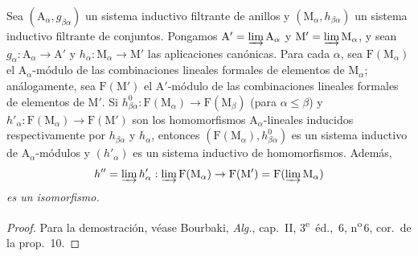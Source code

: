 \begin{lemma}[11.2.2.2]
\label{IV.11.2.2.2}
Sea $(\mathrm{A}_\alpha,g_{\beta\alpha})$ un sistema inductivo filtrante
de anillos y $(\mathrm{M}_\alpha,h_{\beta\alpha})$ un sistema inductivo
filtrante de conjuntos. Pongamos
$\mathrm{A}'=\varinjlim\mathrm{A}_\alpha$ y
$\mathrm{M}'=\varinjlim\mathrm{M}_\alpha$, y sean
$g_\alpha:\mathrm{A}_\alpha\to\mathrm{A}'$ y
$h_\alpha:\mathrm{M}_\alpha\to\mathrm{M}'$ las aplicaciones canónicas. Para
cada $\alpha$, sea $\mathrm{F}(\mathrm{M}_\alpha)$ el
$\mathrm{A}_\alpha$-módulo de las combinaciones lineales formales de elementos de
$\mathrm{M}_\alpha$; análogamente, sea $\mathrm{F}(\mathrm{M}')$ el
$\mathrm{A}'$-módulo de las combinaciones lineales formales de elementos de
$\mathrm{M}'$. Si
$h_{\beta\alpha}^0:\mathrm{F}(\mathrm{M}_\alpha)\to
\mathrm{F}(\mathrm{M}_\beta)$ (para $\alpha\leqslant\beta$) y
$h'_\alpha:\mathrm{F}(\mathrm{M}_\alpha)\to\mathrm{F}(\mathrm{M}')$
son los homomorfismos $\mathrm{A}_\alpha$-lineales inducidos respectivamente por
$h_{\beta\alpha}$ y $h_\alpha$, entonces
$(\mathrm{F}(\mathrm{M}_\alpha),h^0_{\beta\alpha})$ es un sistema inductivo
de $\mathrm{A}_\alpha$-módulos y $(h'_\alpha)$ es un sistema inductivo
de homomorfismos. Además,
\[
  h''=\varinjlim h'_\alpha:\varinjlim\mathrm{F}(\mathrm{M}_\alpha)\to\mathrm{F}(\mathrm{M}')=\mathrm{F}(\varinjlim\mathrm{M}_\alpha)
\]
\emph{es un isomorfismo.}
\end{lemma}

\begin{proof}
Para la demostración, véase Bourbaki, \emph{Alg.}, cap.~II, 3\textsuperscript{e}~\'{e}d., \textsection\,6, n\textsuperscript{o}\,6, cor.\ de la prop.~10.
\end{proof}

